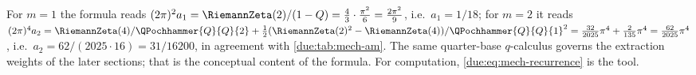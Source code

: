 \documentclass[11pt,oneside]{article}
\theoremstyle{plain}
\theoremstyle{definition}
\theoremstyle{remark}
\newcommand{\Qq}{Q}                                         %
\newcommand{\am}[1]{a_{#1}}                                 %
\begin{document}
For \(m=1\) the formula reads \((2\pi)^{2}\am{1}=\RiemannZeta(2)/(1-\Qq)
=\tfrac43\cdot\tfrac{\pi^{2}}{6}=\tfrac{2\pi^{2}}9\), i.e.\ \(\am{1}=1/18\);
for \(m=2\) it reads
\((2\pi)^{4}\am{2}=\RiemannZeta(4)/\QPochhammer{\Qq}{\Qq}{2}
+\tfrac12(\RiemannZeta(2)^{2}-\RiemannZeta(4))/\QPochhammer{\Qq}{\Qq}{1}^{2}
=\tfrac{32}{2025}\pi^{4}+\tfrac{2}{135}\pi^{4}=\tfrac{62}{2025}\pi^{4}\), i.e.\
\(\am{2}=62/(2025\cdot16)=31/16200\), in agreement with
\cref{due:tab:mech-am}.  The same quarter-base \(q\)-calculus governs the
extraction weights of the later sections; that is the conceptual content of
the formula.  For computation, \cref{due:eq:mech-recurrence} is the tool.

\end{document}
